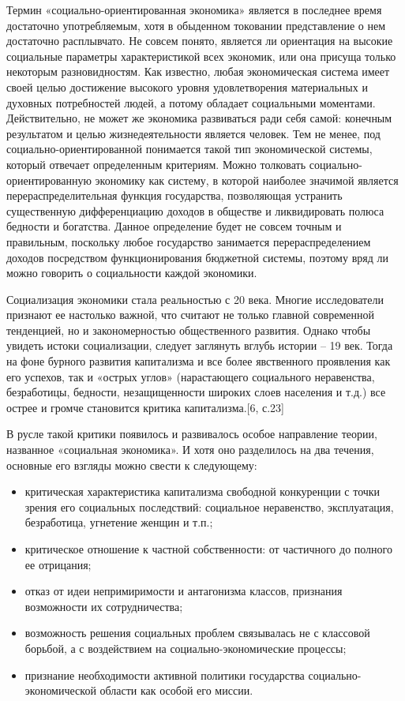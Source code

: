 \documentclass[14pt,a4paper]{article}
\begin{document}
    Термин «социально-ориентированная экономика» является в последнее время достаточно употребляемым, хотя в обыденном токовании представление о нем достаточно расплывчато. Не совсем понято, является ли ориентация на высокие социальные параметры характеристикой всех экономик, или она присуща только некоторым разновидностям. Как известно, любая экономическая система имеет своей целью достижение высокого уровня удовлетворения материальных и духовных потребностей людей, а потому обладает социальными моментами. Действительно, не может же экономика развиваться ради себя самой: конечным результатом и целью жизнедеятельности является человек. Тем не менее, под социально-ориентированной понимается такой тип экономической системы, который отвечает определенным критериям. Можно толковать социально-ориентированную экономику как систему, в которой наиболее значимой является перераспределительная функция государства, позволяющая устранить существенную дифференциацию доходов в обществе и ликвидировать полюса бедности и богатства. Данное определение будет не совсем точным и правильным, поскольку любое государство занимается перераспределением доходов посредством функционирования бюджетной системы, поэтому вряд ли можно говорить о социальности каждой экономики.
    \par
    Социализация экономики стала реальностью с 20 века. Многие исследователи признают ее настолько важной, что считают не только главной современной тенденцией, но и закономерностью общественного развития. Однако чтобы увидеть истоки социализации, следует заглянуть вглубь истории – 19 век. Тогда на фоне бурного развития капитализма и все более явственного проявления как его успехов, так и «острых углов» (нарастающего социального неравенства, безработицы, бедности, незащищенности широких слоев населения и т.д.) все острее и громче становится критика капитализма.[6, с.23]
    \par
    В русле такой критики появилось и развивалось особое направление теории, названное «социальная экономика». И хотя оно разделилось на два течения, основные его взгляды можно свести к следующему:
    \begin{itemize}
        \item критическая характеристика капитализма свободной конкуренции с точки зрения его социальных последствий: социальное неравенство, эксплуатация, безработица, угнетение женщин и т.п.;
        \item критическое отношение к частной собственности: от частичного до полного ее отрицания;
        \item отказ от идеи непримиримости и антагонизма классов, признания возможности их сотрудничества;
        \item возможность решения социальных проблем связывалась не с классовой борьбой, а с воздействием на социально-экономические процессы;
        \item признание необходимости активной политики государства социально-экономической области как особой его миссии.
    \end{itemize}
\end{document}
